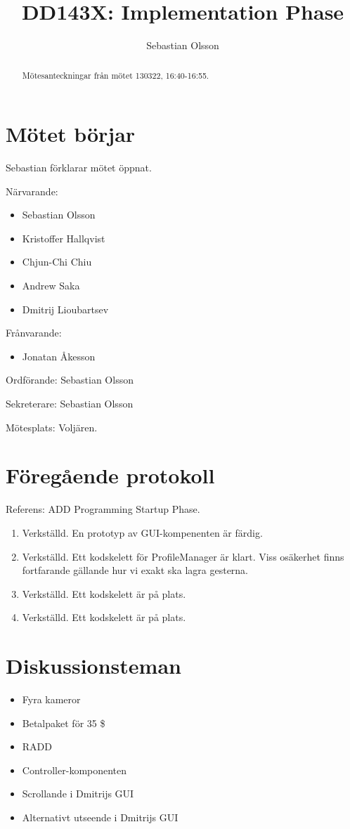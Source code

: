 \documentclass[a4paper,12pt]{article}
\author{Sebastian Olsson}
\title{DD143X: Implementation Phase}
\begin{document}
\maketitle
\begin{abstract}
    Mötesanteckningar från mötet 130322, 16:40-16:55.
\end{abstract}

\section{Mötet börjar}
Sebastian förklarar mötet öppnat.

Närvarande:
\begin{itemize}
\item Sebastian Olsson
\item Kristoffer Hallqvist
\item Chjun-Chi Chiu
\item Andrew Saka
\item Dmitrij Lioubartsev
\end{itemize}
Frånvarande:
\begin{itemize}
\item Jonatan Åkesson
\end{itemize}

Ordförande: Sebastian Olsson

Sekreterare: Sebastian Olsson

Mötesplats: Voljären.

\section{Föregående protokoll}
Referens: ADD Programming Startup Phase.

\begin{enumerate}
\item Verkställd. En prototyp av GUI-kompenenten är färdig.
\item Verkställd. Ett kodskelett för ProfileManager är klart.
Viss osäkerhet finns fortfarande gällande hur vi exakt ska lagra gesterna.
\item Verkställd. Ett kodskelett är på plats.
\item Verkställd. Ett kodskelett är på plats.
\end{enumerate}

\section{Diskussionsteman}
\begin{itemize}
\item Fyra kameror
\item Betalpaket för 35 \$
\item RADD
\item Controller-komponenten
\item Scrollande i Dmitrijs GUI
\item Alternativt utseende i Dmitrijs GUI
\end{itemize}
\end{document}
